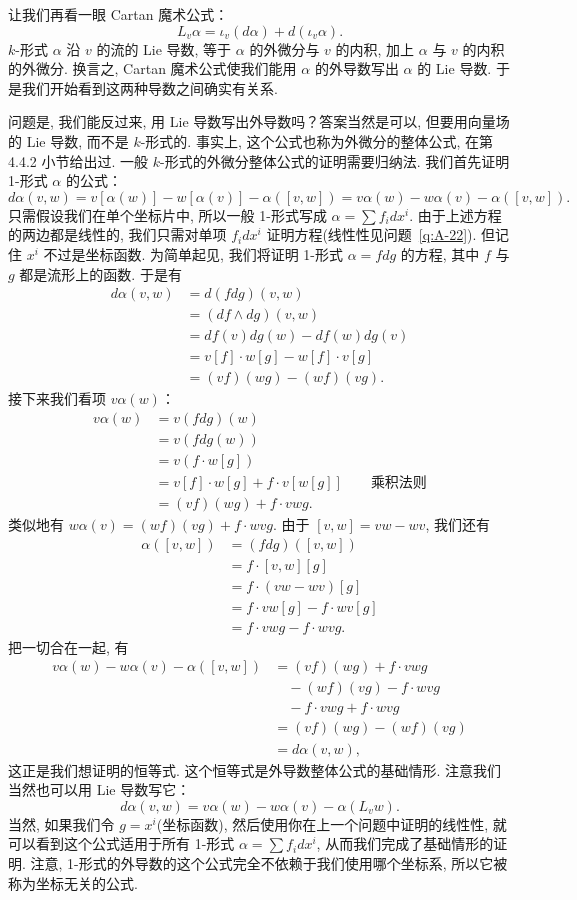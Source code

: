 让我们再看一眼 Cartan 魔术公式：
\[
L_v\alpha=\iota_v(d\alpha)+d(\iota_v\alpha).
\]
$k$-形式 $\alpha$ 沿 $v$ 的流的 Lie 导数, 等于 $\alpha$ 的外微分与 $v$ 的内积, 加上 $\alpha$ 与 $v$ 的内积的外微分. 换言之, Cartan 魔术公式使我们能用 $\alpha$ 的外导数写出 $\alpha$ 的 Lie 导数. 于是我们开始看到这两种导数之间确实有关系.

问题是, 我们能反过来, 用 Lie 导数写出外导数吗？答案当然是可以, 但要用向量场的 Lie 导数, 而不是 $k$-形式的. 事实上, 这个公式也称为外微分的整体公式, 在第 4.4.2 小节给出过. 一般 $k$-形式的外微分整体公式的证明需要归纳法. 我们首先证明 1-形式 $\alpha$ 的公式：
\[
d\alpha(v,w)=v[\alpha(w)]-w[\alpha(v)]-\alpha\left([v,w]\right)
=v\alpha(w)-w\alpha(v)-\alpha\left([v,w]\right).
\]
只需假设我们在单个坐标片中, 所以一般 1-形式写成 $\alpha=\sum f_idx^i$. 由于上述方程的两边都是线性的, 我们只需对单项 $f_idx^i$ 证明方程(线性性见问题~\ref{q:A-22}). 但记住 $x^i$ 不过是坐标函数. 为简单起见, 我们将证明 1-形式 $\alpha=fdg$ 的方程, 其中 $f$ 与 $g$ 都是流形上的函数. 于是有
\begin{align*}
d\alpha(v,w)&=d(fdg)(v,w)\\
&=\left(df\wedge dg\right)(v,w)\\
&=df(v)dg(w)-df(w)dg(v)\\
&=v[f]\cdot w[g]-w[f]\cdot v[g]\\
&=(vf)(wg)-(wf)(vg).
\end{align*}
接下来我们看项 $v\alpha(w)$：
\begin{align*}
v\alpha(w)&=v\left(fdg\right)(w)\\
&=v\left(fdg(w)\right)\\
&=v\left(f\cdot w[g]\right)\\
&=v[f]\cdot w[g]+f\cdot v\left[w[g]\right]\qquad\text{乘积法则}\\
&=(vf)(wg)+f\cdot vwg.
\end{align*}
类似地有 $w\alpha(v)=(wf)(vg)+f\cdot wvg$. 由于 $[v,w]=vw-wv$, 我们还有
\begin{align*}
\alpha\left([v,w]\right)&=(fdg)\left([v,w]\right)\\
&=f\cdot[v,w][g]\\
&=f\cdot(vw-wv)[g]\\
&=f\cdot vw[g]-f\cdot wv[g]\\
&=f\cdot vwg-f\cdot wvg.
\end{align*}
把一切合在一起, 有
\begin{align*}
v\alpha(w)-w\alpha(v)-\alpha\left([v,w]\right)
&=(vf)(wg)+f\cdot vwg\\
&\quad-(wf)(vg)-f\cdot wvg\\
&\quad-f\cdot vwg+f\cdot wvg\\
&=(vf)(wg)-(wf)(vg)\\
&=d\alpha(v,w),
\end{align*}
这正是我们想证明的恒等式. 这个恒等式是外导数整体公式的基础情形. 注意我们当然也可以用 Lie 导数写它：
\[
d\alpha(v,w)=v\alpha(w)-w\alpha(v)-\alpha\left(L_vw\right).
\]
当然, 如果我们令 $g=x^i$(坐标函数), 然后使用你在上一个问题中证明的线性性, 就可以看到这个公式适用于所有 1-形式 $\alpha=\sum f_idx^i$, 从而我们完成了基础情形的证明. 注意, 1-形式的外导数的这个公式完全不依赖于我们使用哪个坐标系, 所以它被称为坐标无关的公式.

